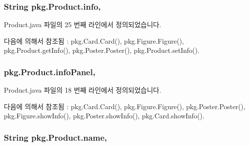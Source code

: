 \subsubsection[{\texorpdfstring{info}{info}}]{\setlength{\rightskip}{0pt plus 5cm}String pkg.\+Product.\+info\hspace{0.3cm}{\ttfamily [protected]}, {\ttfamily [inherited]}}\hypertarget{classpkg_1_1_product_ade3d909a0e7d15ec98c2f27eecd637cd}{}\label{classpkg_1_1_product_ade3d909a0e7d15ec98c2f27eecd637cd}


Product.\+java 파일의 25 번째 라인에서 정의되었습니다.



다음에 의해서 참조됨 \+:  pkg.\+Card.\+Card(), pkg.\+Figure.\+Figure(), pkg.\+Product.\+get\+Info(), pkg.\+Poster.\+Poster(), pkg.\+Product.\+set\+Info().

\subsubsection[{\texorpdfstring{info\+Panel}{infoPanel}}]{ pkg.\+Product.\+info\+Panel\hspace{0.3cm}{\ttfamily [protected]}, {\ttfamily [inherited]}}\hypertarget{classpkg_1_1_product_a6755de182d9383bc860fa44a8a01789d}{}\label{classpkg_1_1_product_a6755de182d9383bc860fa44a8a01789d}


Product.\+java 파일의 18 번째 라인에서 정의되었습니다.



다음에 의해서 참조됨 \+:  pkg.\+Card.\+Card(), pkg.\+Figure.\+Figure(), pkg.\+Poster.\+Poster(), pkg.\+Figure.\+show\+Info(), pkg.\+Poster.\+show\+Info(), pkg.\+Card.\+show\+Info().

\subsubsection[{\texorpdfstring{name}{name}}]{\setlength{\rightskip}{0pt plus 5cm}String pkg.\+Product.\+name\hspace{0.3cm}{\ttfamily [protected]}, {\ttfamily [inherited]}}\hypertarget{classpkg_1_1_product_acdadb9558664acdfd23eff5b2b77ae90}{}\label{classpkg_1_1_product_acdadb9558664acdfd23eff5b2b77ae90}



